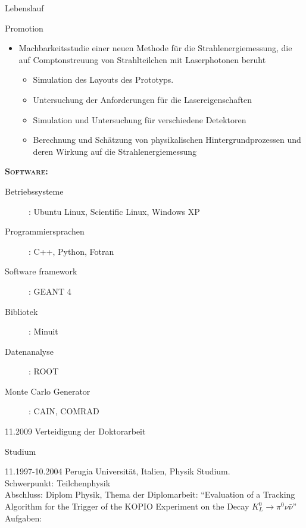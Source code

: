 \documentclass[11pt,a4paper]{scrartcl}
\begin{document}
\begin{cv}{Lebenslauf}
\begin{cvlist}{Promotion}
\begin{itemize}
    \item Machbarkeitsstudie einer neuen Methode f{\"u}r die
      Strahlenergiemessung, die auf Comptonstreuung von
      Strahlteilchen mit Laserphotonen beruht
      \begin{itemize}
      \item Simulation des Layouts des Prototyps.
      \item Untersuchung der Anforderungen f{\"u}r die
        Lasereigenschaften
      \item Simulation und Untersuchung f{\"u}r verschiedene
        Detektoren
      \item Berechnung und Sch{\"a}tzung von physikalischen
        Hintergrundprozessen und deren Wirkung auf die
        Strahlenergiemessung
      \end{itemize}
      
    \end{itemize}
    
    {\scshape {\bfseries Software:}}
    \begin{description} 
    \item[Betriebssysteme] : Ubuntu Linux, Scientific Linux, Windows XP
    \item[Programmiersprachen] : C++, Python, Fotran
    \item[Software framework] : GEANT 4
    \item[Bibliotek] : Minuit
    \item[Datenanalyse] : ROOT
    \item[Monte Carlo Generator] : CAIN, COMRAD
    \end{description}
    
  \item[11.2009] Verteidigung der Doktorarbeit
    
  \end{cvlist}
  
  \begin{cvlist}{Studium}
  \item [11.1997-10.2004]Perugia Universit\"at, Italien, Physik
    Studium. \\ Schwerpunkt: Teilchenphysik\\ Abschluss: Diplom
    Physik, Thema der Diplomarbeit: "`Evaluation of a Tracking
    Algorithm for the Trigger of the KOPIO Experiment on the Decay
    $K_L^0\rightarrow\pi^0\nu\bar{\nu}$"'\\
    
    Aufgaben:\\
    

\end{cvlist}
\end{cv}
\end{document}
